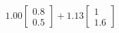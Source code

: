\documentclass[preview]{standalone}
\begin{document}
\begin{align*}
1.00 \begin{bmatrix} 0.8 \\ 0.5 \end{bmatrix} + 1.13 \begin{bmatrix} 1 \\ 1.6 \end{bmatrix}
\end{align*}
\end{document}
